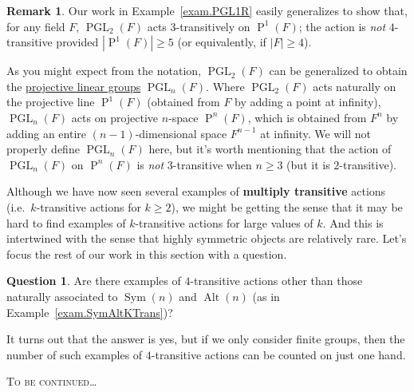 \documentclass[11pt]{amsart}
\theoremstyle{plain}
\theoremstyle{definition}
\newtheorem*{remark*}{Remark}
\newtheorem*{question*}{Question}
\theoremstyle{remark}
\DeclareMathOperator{\Sym}{Sym}
\DeclareMathOperator{\Alt}{Alt}
\DeclareMathOperator{\PGL}{PGL}
\DeclareMathOperator{\Proj}{P}
\begin{document}
\begin{remark*}
Our work in Example~\ref{exam.PGL1R} easily generalizes to show that, for any field $F$,  $\PGL_2(F)$ acts $3$-transitively on $\Proj^1(F)$; the action is \emph{not} $4$-transitive provided $|\Proj^1(F)| \ge 5$ (or equivalently, if $|F| \ge 4$). 
\end{remark*}

As you might expect from the notation, $\PGL_2(F)$ can be generalized to obtain the \href{https://en.wikipedia.org/wiki/Projective_linear_group}{projective linear groups} $\PGL_n(F)$. Where $\PGL_2(F)$ acts naturally on the projective line $\Proj^1(F)$ (obtained from $F$ by adding a point at infinity), $\PGL_n(F)$ acts on projective $n$-space $\Proj^n(F)$, which is obtained from $F^n$ by adding an entire $(n-1)$-dimensional space $F^{n-1}$ at infinity. We will not properly define $\PGL_n(F)$ here, but it's worth mentioning  that the action of $\PGL_n(F)$ on $\Proj^n(F)$ is \emph{not} $3$-transitive when $n\ge 3$ (but it is $2$-transitive).

Although we have now seen several examples  of \textbf{multiply transitive} actions (i.e.~$k$-transitive actions for $k\ge 2$), we might be getting the sense that it may be hard to find examples of $k$-transitive actions for large values of $k$. And this is intertwined with the sense that highly symmetric objects are relatively rare. Let's focus the rest of our work in this section with a question. 

\begin{question*}
Are there examples of $4$-transitive actions other than those naturally associated to $\Sym(n)$ and $\Alt(n)$ (as in Example~\ref{exam.SymAltKTrans})? %
\end{question*}

It turns out that the answer is yes, but if we only consider finite groups, then the number of such examples of $4$-transitive actions can be counted on just one hand.












\vfill

\begin{center}
    \textsc{To be continued}\dots
\end{center}

\newpage



\end{document}
